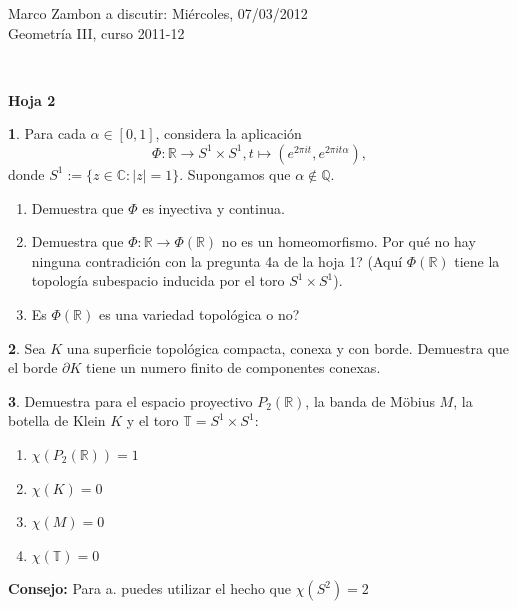 \documentclass[12pt,a4paper]{report}
\theoremstyle{definition}
\newtheorem{ex}{}
\newcommand{\CC}{\ensuremath{\mathbb C}}
\newcommand{\RR}{\ensuremath{\mathbb R}}
\newcommand{\QQ}{\ensuremath{\mathbb Q}}
\newcommand{\TT}{\ensuremath{\mathbb T}}
\begin{document}
\noindent
{\sffamily\large Marco Zambon 
\hfill   a discutir:   Mi\'ercoles, 07/03/2012\\Geometr\'ia III, curso 2011-12}
 

\noindent
\hrulefill{}\\
\begin{center}\bfseries\large\textsf{Hoja 2    \vspace{-2mm}}
\end{center}

\noindent

\begin{ex} 
Para cada $\alpha \in [0,1]$, considera la aplicaci\'on
$$\Phi \colon \RR\to S^1\times S^1, t\mapsto (e^{2\pi i t}, e^{2\pi i t \alpha}),$$
donde $S^1:=\{z\in \CC: |z|=1\}$. Supongamos que $\alpha  \notin \QQ$.
\begin{enumerate} 
\item Demuestra que   $\Phi$ es inyectiva y continua.
\item Demuestra que $\Phi \colon \RR \to \Phi(\RR)$ no es un homeomorfismo. Por qu\'e no hay ninguna contradici\'on con la pregunta 4a de la hoja 1? (Aqu\'i $\Phi(\RR)$ tiene la topolog\'ia subespacio inducida por el toro $S^1\times S^1$). 
\item  Es $\Phi(\RR)$ es una variedad topol\'ogica o no?
\end{enumerate}
\end{ex}


\begin{ex}
Sea $K$ una superficie topol\'ogica compacta, conexa y con borde.
Demuestra que el borde $\partial K$ tiene un numero finito de componentes conexas.
\end{ex} 
 
\begin{ex}  
Demuestra para el espacio proyectivo $P_2(\RR)$, la banda de M\"obius $M$, la botella de Klein $K$ y el toro $\TT=S^1\times S^1$:
\begin{enumerate}
\item  $\chi(P_2(\RR))=1$
\item  $\chi(K)=0$
\item $\chi(M)=0$
\item $\chi(\TT)=0$
\end{enumerate}
\textbf{Consejo:}  Para a. puedes utilizar el hecho que $\chi(S^2)=2$
\end{ex}
 
\end{document}
